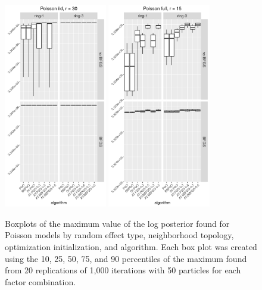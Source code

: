 \documentclass[12pt]{article}
\begin{document}
\begin{figure}[!ht]
\centering
\includegraphics[width=0.4\textwidth]{code/pop/maxplot12.png}
\includegraphics[width=0.4\textwidth]{code/pop/maxplot14.png}
\caption{Boxplots of the maximum value of the log posterior found for Poisson models by random effect type, neighborhood topology, optimization initialization, and algorithm. Each box plot was created using the 10, 25, 50, 75, and 90 percentiles of the maximum found from 20 replications of 1,000 iterations with 50 particles for each factor combination.}
\label{fig:popmaxboxplot}
\end{figure}
\end{document}
